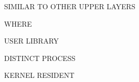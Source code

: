 

%


%


\begin{bwslide}

\begin{nrtc}
\item	SIMILAR TO OTHER UPPER LAYERS
\item	WHERE
	\begin{nrtc}
	\item	USER LIBRARY
	\item	DISTINCT PROCESS
	\item	KERNEL RESIDENT
	\end{nrtc}
\end{nrtc}
\end{bwslide}


%



